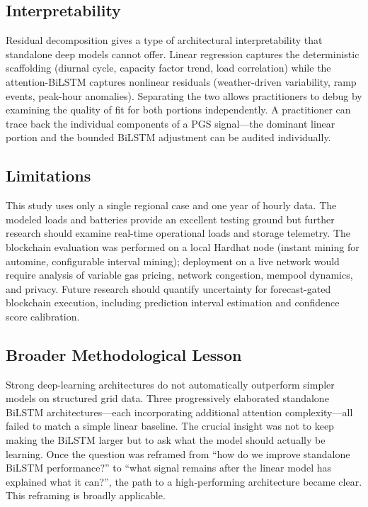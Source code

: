 \documentclass{ieeeaccess}
\begin{document}
\subsection{Interpretability}
Residual decomposition gives a type of architectural interpretability that standalone deep models cannot offer. Linear regression captures the deterministic scaffolding (diurnal cycle, capacity factor trend, load correlation) while the attention-BiLSTM captures nonlinear residuals (weather-driven variability, ramp events, peak-hour anomalies). Separating the two allows practitioners to debug by examining the quality of fit for both portions independently. A practitioner can trace back the individual components of a PGS signal---the dominant linear portion and the bounded BiLSTM adjustment can be audited individually.

\subsection{Limitations}
This study uses only a single regional case and one year of hourly data. The modeled loads and batteries provide an excellent testing ground but further research should examine real-time operational loads and storage telemetry. The blockchain evaluation was performed on a local Hardhat node (instant mining for automine, configurable interval mining); deployment on a live network would require analysis of variable gas pricing, network congestion, mempool dynamics, and privacy. Future research should quantify uncertainty for forecast-gated blockchain execution, including prediction interval estimation and confidence score calibration.

\subsection{Broader Methodological Lesson}
Strong deep-learning architectures do not automatically outperform simpler models on structured grid data. Three progressively elaborated standalone BiLSTM architectures---each incorporating additional attention complexity---all failed to match a simple linear baseline. The crucial insight was not to keep making the BiLSTM larger but to ask what the model should actually be learning. Once the question was reframed from ``how do we improve standalone BiLSTM performance?'' to ``what signal remains after the linear model has explained what it can?'', the path to a high-performing architecture became clear. This reframing is broadly applicable.
\end{document}
